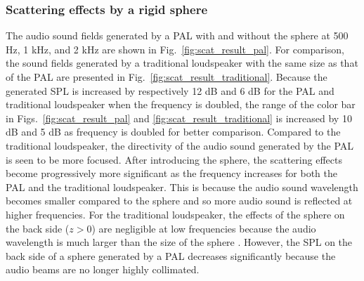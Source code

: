 \subsubsection{Scattering effects by a rigid sphere}
The audio sound fields generated by a PAL with and without the sphere at 500 Hz, 1 kHz, and 2 kHz are shown in Fig.~\ref{fig:scat_result_pal}. 
For comparison, the sound fields generated by a traditional loudspeaker with the same size as that of the PAL are presented in Fig.~\ref{fig:scat_result_traditional}. 
Because the generated SPL is increased by respectively 12 dB and 6 dB for the PAL and traditional loudspeaker when the frequency is doubled, the range of the color bar in Figs.~\ref{fig:scat_result_pal} and \ref{fig:scat_result_traditional} is increased by 10 dB and 5 dB as frequency is doubled for better comparison. 
Compared to the traditional loudspeaker, the directivity of the audio sound generated by the PAL is seen to be more focused. 
After introducing the sphere, the scattering effects become progressively more significant as the frequency increases for both the PAL and the traditional loudspeaker. 
This is because the audio sound wavelength becomes smaller compared to the sphere and so more audio sound is reflected at higher frequencies. 
For the traditional loudspeaker, the effects of the sphere on the back side ($z > 0$) are negligible at low frequencies because the audio wavelength is much larger than the size of the sphere \cite{Zou2008PerformanceAnalysisVirtual}. 
However, the SPL on the back side of a sphere generated by a PAL decreases significantly because the audio beams are no longer highly collimated.


